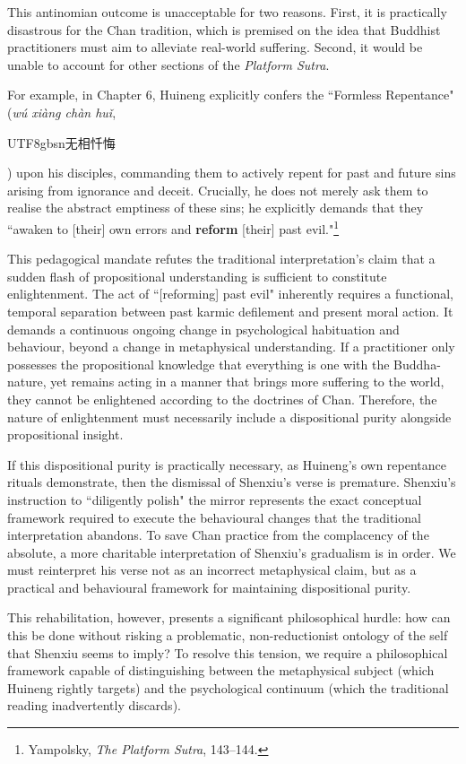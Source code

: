 This antinomian outcome is unacceptable for two reasons. First, it is
practically disastrous for the Chan tradition, which is premised on the
idea that Buddhist practitioners must aim to alleviate real-world
suffering. Second, it would be unable to account for other sections of
the \emph{Platform Sutra}.

For example, in Chapter 6, Huineng explicitly confers the ``Formless
Repentance" (\emph{wú xiàng chàn huǐ}, \begin{CJK*}{UTF8}{gbsn}无相忏悔\end{CJK*}) upon his disciples,
commanding them to actively repent for past and future sins arising from
ignorance and deceit. Crucially, he does not merely ask them to realise
the abstract emptiness of these sins; he explicitly demands that they
``awaken to {[}their{]} own errors and \textbf{reform} {[}their{]} past
evil."\footnote{Yampolsky, \emph{The Platform Sutra}, 143--144.}

This pedagogical mandate refutes the traditional interpretation's claim
that a sudden flash of propositional understanding is sufficient to
constitute enlightenment. The act of ``{[}reforming{]} past evil"
inherently requires a functional, temporal separation between past
karmic defilement and present moral action. It demands a continuous
ongoing change in psychological habituation and behaviour, beyond a
change in metaphysical understanding. If a practitioner only possesses
the propositional knowledge that everything is one with the
Buddha-nature, yet remains acting in a manner that brings more suffering
to the world, they cannot be enlightened according to the doctrines of
Chan. Therefore, the nature of enlightenment must necessarily include a
dispositional purity alongside propositional insight.

If this dispositional purity is practically necessary, as Huineng's own
repentance rituals demonstrate, then the dismissal of Shenxiu's verse is
premature. Shenxiu's instruction to ``diligently polish" the mirror
represents the exact conceptual framework required to execute the
behavioural changes that the traditional interpretation abandons. To
save Chan practice from the complacency of the absolute, a more
charitable interpretation of Shenxiu's gradualism is in order. We must
reinterpret his verse not as an incorrect metaphysical claim, but as a
practical and behavioural framework for maintaining dispositional
purity.

This rehabilitation, however, presents a significant philosophical
hurdle: how can this be done without risking a problematic,
non-reductionist ontology of the self that Shenxiu seems to imply? To
resolve this tension, we require a philosophical framework capable of
distinguishing between the metaphysical subject (which Huineng rightly
targets) and the psychological continuum (which the traditional reading
inadvertently discards).

